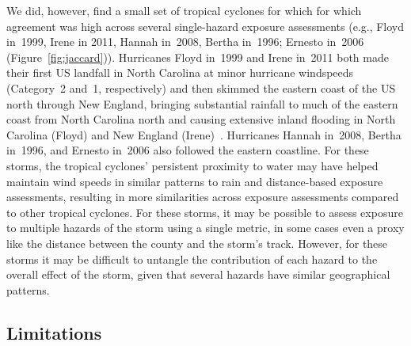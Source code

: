 We did, however, find a small set of tropical cyclones for which for which
agreement was high across several single-hazard exposure assessments (e.g.,
Floyd in~1999, Irene in 2011, Hannah in~2008, Bertha in~1996; Ernesto in~2006
(Figure~\ref{fig:jaccard})).  Hurricanes Floyd in~1999 and Irene in~2011 both
made their first \ac{US} landfall in North Carolina at minor hurricane
windspeeds (Category~2 and~1, respectively) and then skimmed the eastern coast
of the \ac{US} north through New England, bringing substantial rainfall to much
of the eastern coast from North Carolina north and causing extensive inland
flooding in North Carolina (Floyd) and New England
(Irene)~\parencite{avila2013atlantic, lawrence2000atlantic}.  Hurricanes Hannah
in~2008, Bertha in~1996, and Ernesto in~2006 also followed the eastern
coastline. For these storms, the tropical cyclones' persistent proximity to
water may have helped maintain wind speeds in similar patterns to rain and
distance-based exposure assessments, resulting in more similarities across
exposure assessments compared to other tropical cyclones.  For these storms, it
may be possible to assess exposure to multiple hazards of the storm using a
single metric, in some cases even a proxy like the distance between the county
and the storm's track.  However, for these storms it may be difficult to
untangle the contribution of each hazard to the overall effect of the storm,
given that several hazards have similar geographical patterns. 

\subsection*{Limitations}

